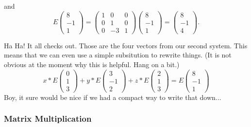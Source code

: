 \documentclass[10pt,]{book}
\theoremstyle{plain}
\numberwithin{equation}{section}
\begin{document}
        and
        \[
          E \begin{pmatrix} 8 \\ -1 \\ 1 \end{pmatrix} =
          \begin{pmatrix} 1 &0 &0 \\ 0 &1 &0 \\
          0 &-3 &1 \end{pmatrix} \begin{pmatrix} 8 \\ -1 \\ 1 \end{pmatrix}
          = \begin{pmatrix} 8 \\ -1 \\ 4 \end{pmatrix}.
        \]
\par

        Ha Ha! It all checks out. Those are the four vectors from our second
        system. This means that we can even use a simple subsitution to rewrite
        things. (It is not obvious at the moment why this is helpful. Hang on a
        bit.)
        \[
          x* E\begin{pmatrix} 0 \\ 1 \\ 3 \end{pmatrix} +
          y* E\begin{pmatrix} 3 \\ -1 \\ 2 \end{pmatrix} +
          z* E\begin{pmatrix} 2 \\ 1 \\ 3 \end{pmatrix} =
          E\begin{pmatrix} 8 \\ -1 \\ 1 \end{pmatrix}
        \]
        Boy, it sure would be nice if we had a compact way to write that down...
\typeout{************************************************}
\typeout{************************************************}
\subsubsection[Matrix Multiplication]{Matrix Multiplication}\label{subsubsection-15}
\end{document}
